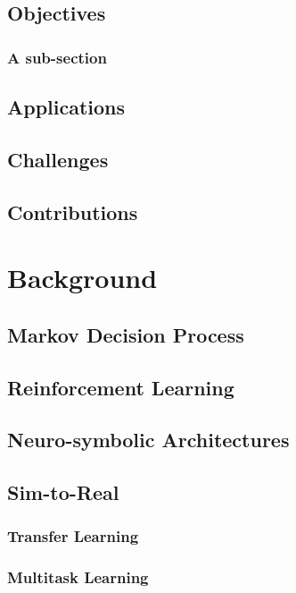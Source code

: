 \documentclass[doublespace,draft,nopageskip]{VTthesis} %
\begin{document}
    \section{Objectives} \label{se:objectives}
			\lipsum[2]
			\subsection{A sub-section} \label{ss:this_subsection}
				\lipsum[1-4]
	\section{Applications} \label{se:applications}
	\section{Challenges} \label{se:challenges}
	\section{Contributions} \label{se:contributions}
			\lipsum[1-2]

    \chapter{Background} \label{ch:background}
    \section{Markov Decision Process} \label{se:markov_decision_process}
    \section{Reinforcement Learning} \label{se:reinforcement_learning}
    \section{Neuro-symbolic Architectures} \label{se:neurosymbolic_architectures}
    \section{Sim-to-Real} \label{se:sim_to_real}
        \subsection{Transfer Learning} \label{ss: transfer_learning}
        \subsection{Multitask Learning} \label{ss:multitask_learning}
\end{document}
